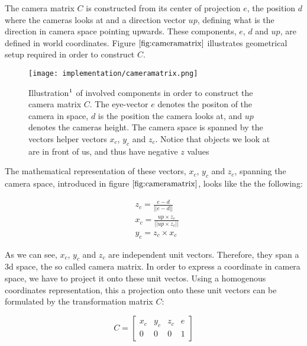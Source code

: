 The camera matrix $C$ is constructed from its center of projection $e$, the position $d$ where the cameras looks at and a direction vector $up$, defining what is the direction in camera space pointing upwards. These components, $e$, $d$ and $up$, are defined in world coordinates. Figure $\ref{fig:cameramatrix}$ illustrates geometrical setup required in order to construct $C$.

\begin{figure}[H]
  \centering
  \texttt{[image: implementation/cameramatrix.png]}
  \caption[Camera Matrix]{Illustration$\footnotemark$ of involved components in order to construct the camera matrix $C$. The eye-vector $e$ denotes the positon of the camera in space, $d$ is the position the camera looks at, and $up$ denotes the cameras height. The camera space is spanned by the vectors helper vectors $x_c$, $y_c$ and $z_c$. Notice that objects we look at are in front of us, and thus have negative $z$ values}
  \label{fig:cameramatrix}
\end{figure}

The mathematical representation of these vectors, $x_c$, $y_c$ and $z_c$, spanning the camera space, introduced in figure $\ref{fig:cameramatrix}$, looks like the the following: 

\begin{align}
  &z_c = \frac{e-d}{||e-d||} \nonumber \\
  &x_c = \frac{up \times z_c}{||up \times z_c||} \nonumber \\
  &y_c = z_c \times x_c
  \label{eq:cameraspacespanningvectors}
\end{align}

As we can see, $x_c$, $y_c$ and $z_c$ are independent unit vectors. Therefore, they span a 3d space, the so called camera matrix. In order to express a coordinate in camera space, we have to project it onto these unit vectos. Using a homogenous coordinates representation, this a projection onto these unit vectors can be formulated by the transformation matrix $C$:

\begin{equation}
  C = \begin{bmatrix} x_c & y_c & z_c & e \\ 0 & 0 & 0 & 1 \end{bmatrix}
  \label{eq:cameramatrixeq}
\end{equation}

